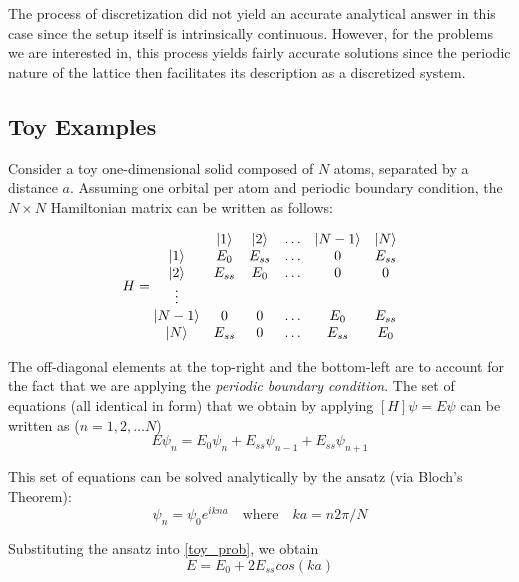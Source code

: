 The process of discretization did not yield an accurate analytical answer in this case since the setup itself is intrinsically continuous. However, for the problems we are interested in, this process yields fairly accurate solutions since the periodic nature of the lattice then facilitates its description as a discretized system. 

\clearpage

\subsection{Toy Examples}

Consider a toy one-dimensional solid composed of $N$ atoms, separated by a distance $a$. Assuming one orbital per atom and periodic boundary condition, the $N\times N$ Hamiltonian matrix can be written as follows:

\begin{equation}
H =
\begin{matrix}
     & \ket{1} & \ket{2} & \ldots & \ket{N-1} & \ket{N} \\
    \ket{1} & E_0 & E_{ss} & \ldots & 0 & E_{ss} \\
    \ket{2} & E_{ss} & E_0 & \ldots & 0 & 0 \\
    \vdots  &  &  &  &  &  \\
    \ket{N-1} & 0 & 0 & \ldots & E_0 & E_{ss} \\
    \ket{N} & E_{ss} & 0 & \ldots & E_{ss} & E_0 \\
\end{matrix}   
\end{equation}

The off-diagonal elements at the top-right and the bottom-left are to account for the fact that we are applying the \textit{periodic boundary condition}. The set of equations (all identical in form) that we obtain by applying $[H]\psi = E\psi$ can be written as ($n = 1, 2,\ldots N$)
\begin{equation*} \label{toy_prob}
    E\psi_{n} = E_0\psi_{n} + E_{ss}\psi_{n-1} + E_{ss}\psi_{n+1}
\end{equation*}

This set of equations can be solved analytically by the ansatz (via Bloch's Theorem):
\begin{equation*} 
    \psi_{n} = \psi_0 e^{ikna} \quad \text{where} \quad ka = n2\pi/N
\end{equation*}

Substituting the ansatz into \ref{toy_prob}, we obtain
\begin{equation}
    E = E_0 + 2E_{ss}cos(ka)
\end{equation}

